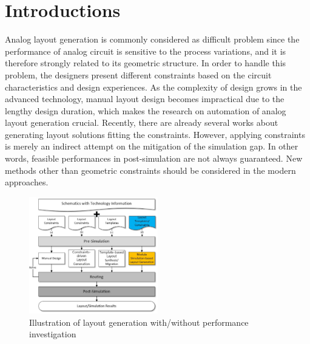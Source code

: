 \section{Introductions}\label{sec:intro}

Analog layout generation is commonly considered as difficult problem since the performance of analog circuit is sensitive to the process variations, and it is therefore strongly related to its geometric structure. In order to handle this problem, the designers present different constraints based on the circuit characteristics and design experiences. As the complexity of design grows in the advanced technology, manual layout design becomes impractical due to the lengthy design duration, which makes the research on automation of analog layout generation crucial. Recently, there are already several works about generating layout solutions fitting the constraints. However, applying constraints is merely an indirect attempt on the mitigation of the simulation gap. In other words, feasible performances in post-simulation are not always guaranteed. New methods other than geometric constraints should be considered in the modern approaches. 

\begin{figure}[ht]
    \begin{center}
    \includegraphics[width=0.5\textwidth]{Fig/Flow1.eps}
    \vspace{-1em}
    \caption{Illustration of layout generation with/without performance investigation} 
    \label{fig:Flow1}  
    \end{center}
    \vspace{-2em}
\end{figure}

